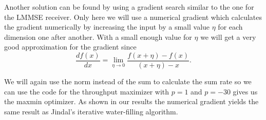 Another solution can be found by using a gradient search similar to the one for the LMMSE receiver. Only here we will use a numerical gradient which calculates the gradient numerically by increasing the input by a small value $\eta$ for each dimension one after another. With a small enough value for $\eta$ we will get a very good approximation for the gradient since
\begin{equation}
	\frac{df(x)}{dx}= \lim_{\eta\to 0}{\frac{f(x+\eta)-f(x)}{(x+\eta)-x}}.
\end{equation}
\begin{algorithm}
\end{algorithm}
We will again use the norm instead of the sum to calculate the sum rate so we can use the code for the throughput maximizer with $p=1$ and $p=-30$ gives us the maxmin optimizer. As shown in our results the numerical gradient yields the same result as Jindal's iterative water-filling algorithm.